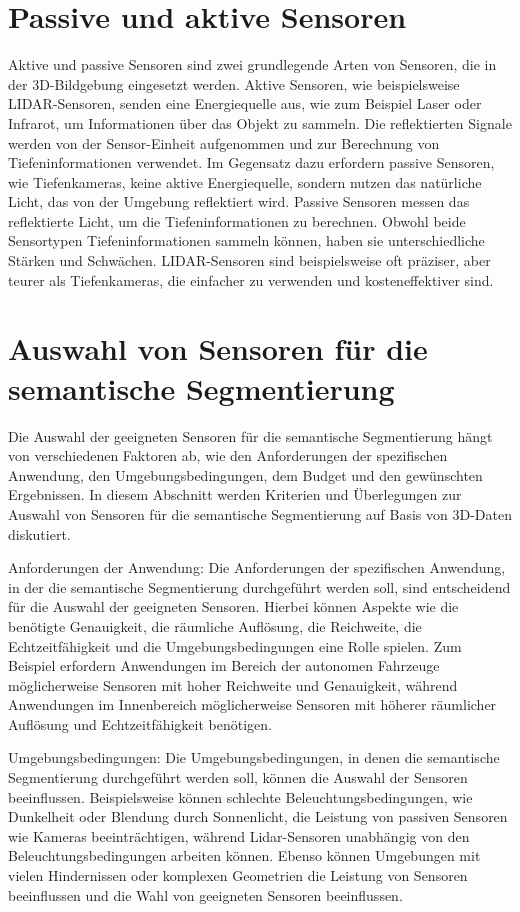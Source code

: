 \section{Passive und aktive Sensoren}
Aktive und passive Sensoren sind zwei grundlegende Arten von Sensoren, die in
der 3D-Bildgebung eingesetzt werden. Aktive Sensoren, wie beispielsweise
LIDAR-Sensoren, senden eine Energiequelle aus, wie zum Beispiel Laser oder
Infrarot, um Informationen über das Objekt zu sammeln. Die reflektierten
Signale werden von der Sensor-Einheit aufgenommen und zur Berechnung von
Tiefeninformationen verwendet. Im Gegensatz dazu erfordern passive Sensoren,
wie Tiefenkameras, keine aktive Energiequelle, sondern nutzen das natürliche
Licht, das von der Umgebung reflektiert wird. Passive Sensoren messen das
reflektierte Licht, um die Tiefeninformationen zu berechnen. Obwohl beide
Sensortypen Tiefeninformationen sammeln können, haben sie unterschiedliche
Stärken und Schwächen. LIDAR-Sensoren sind beispielsweise oft präziser, aber
teurer als Tiefenkameras, die einfacher zu verwenden und kosteneffektiver sind.

\section{Auswahl von Sensoren für die semantische Segmentierung}

Die Auswahl der geeigneten Sensoren für die semantische Segmentierung hängt von
verschiedenen Faktoren ab, wie den Anforderungen der spezifischen Anwendung,
den Umgebungsbedingungen, dem Budget und den gewünschten Ergebnissen. In diesem
Abschnitt werden Kriterien und Überlegungen zur Auswahl von Sensoren für die
semantische Segmentierung auf Basis von 3D-Daten diskutiert.

Anforderungen der Anwendung: Die Anforderungen der spezifischen Anwendung, in
der die semantische Segmentierung durchgeführt werden soll, sind entscheidend
für die Auswahl der geeigneten Sensoren. Hierbei können Aspekte wie die
benötigte Genauigkeit, die räumliche Auflösung, die Reichweite, die
Echtzeitfähigkeit und die Umgebungsbedingungen eine Rolle spielen. Zum Beispiel
erfordern Anwendungen im Bereich der autonomen Fahrzeuge möglicherweise
Sensoren mit hoher Reichweite und Genauigkeit, während Anwendungen im
Innenbereich möglicherweise Sensoren mit höherer räumlicher Auflösung und
Echtzeitfähigkeit benötigen.

Umgebungsbedingungen: Die Umgebungsbedingungen, in denen die semantische
Segmentierung durchgeführt werden soll, können die Auswahl der Sensoren
beeinflussen. Beispielsweise können schlechte Beleuchtungsbedingungen, wie
Dunkelheit oder Blendung durch Sonnenlicht, die Leistung von passiven Sensoren
wie Kameras beeinträchtigen, während Lidar-Sensoren unabhängig von den
Beleuchtungsbedingungen arbeiten können. Ebenso können Umgebungen mit vielen
Hindernissen oder komplexen Geometrien die Leistung von Sensoren beeinflussen
und die Wahl von geeigneten Sensoren beeinflussen.

